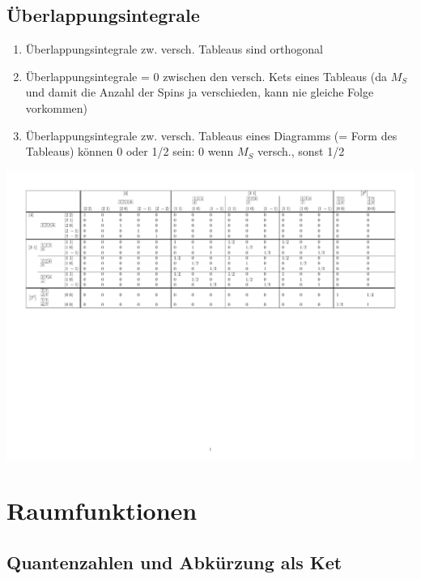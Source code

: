 \documentclass[12pt,a4paper]{article}
\begin{document}
\subsection{Überlappungsintegrale}
\begin{enumerate}
\item Überlappungsintegrale zw. versch. Tableaus sind orthogonal
\item Überlappungsintegrale = 0 zwischen den versch. Kets eines Tableaus (da $M_S$ und damit die Anzahl der Spins ja verschieden, kann nie gleiche Folge vorkommen)
\item Überlappungsintegrale zw. versch. Tableaus eines Diagramms (= Form des Tableaus) können 0 oder 1/2 sein: 0 wenn $M_S$ versch., sonst 1/2
\end{enumerate}


 \includegraphics[scale=0.4]{build/Ueberlappung_Spin_cropped.pdf}




 \newpage
 \section{Raumfunktionen} 
 
 \subsection{Quantenzahlen und Abkürzung als Ket}
 
\end{document}
